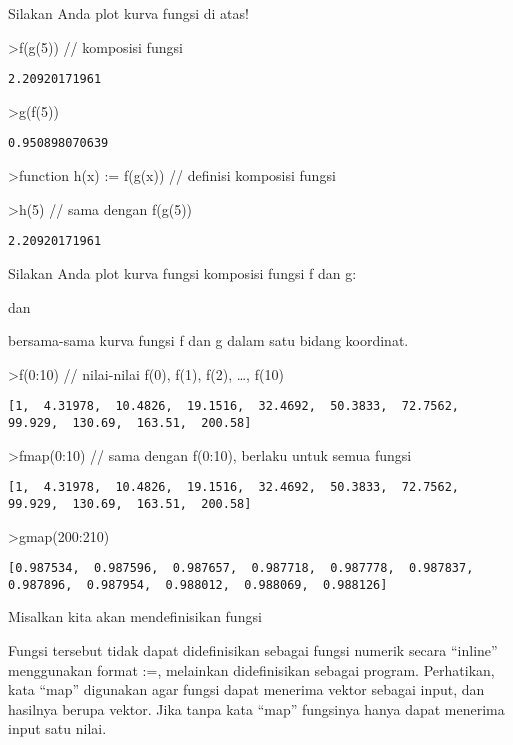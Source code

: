 \documentclass[
]{book}
\begin{document}
Silakan Anda plot kurva fungsi di atas!

\textgreater f(g(5)) // komposisi fungsi

\begin{verbatim}
2.20920171961
\end{verbatim}

\textgreater g(f(5))

\begin{verbatim}
0.950898070639
\end{verbatim}

\textgreater function h(x) := f(g(x)) // definisi komposisi fungsi

\textgreater h(5) // sama dengan f(g(5))

\begin{verbatim}
2.20920171961
\end{verbatim}

Silakan Anda plot kurva fungsi komposisi fungsi f dan g:

dan

bersama-sama kurva fungsi f dan g dalam satu bidang koordinat.

\textgreater f(0:10) // nilai-nilai f(0), f(1), f(2), \ldots, f(10)

\begin{verbatim}
[1,  4.31978,  10.4826,  19.1516,  32.4692,  50.3833,  72.7562,
99.929,  130.69,  163.51,  200.58]
\end{verbatim}

\textgreater fmap(0:10) // sama dengan f(0:10), berlaku untuk semua fungsi

\begin{verbatim}
[1,  4.31978,  10.4826,  19.1516,  32.4692,  50.3833,  72.7562,
99.929,  130.69,  163.51,  200.58]
\end{verbatim}

\textgreater gmap(200:210)

\begin{verbatim}
[0.987534,  0.987596,  0.987657,  0.987718,  0.987778,  0.987837,
0.987896,  0.987954,  0.988012,  0.988069,  0.988126]
\end{verbatim}

Misalkan kita akan mendefinisikan fungsi

Fungsi tersebut tidak dapat didefinisikan sebagai fungsi numerik secara ``inline'' menggunakan format :=, melainkan didefinisikan sebagai program. Perhatikan, kata ``map'' digunakan agar fungsi dapat menerima vektor sebagai input, dan hasilnya berupa vektor. Jika tanpa kata ``map'' fungsinya hanya dapat menerima input satu nilai.
\end{document}
